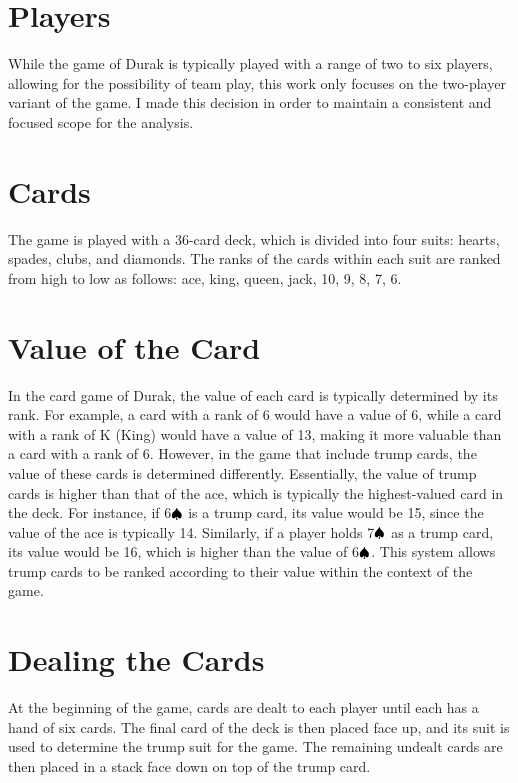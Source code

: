 \section{Players}
While the game of Durak is typically played with a range of two to six players, allowing for the possibility of team play, this work only focuses on the two-player variant of the game. I made this decision in order to maintain a consistent and focused scope for the analysis.

\section{Cards}
The game is played with a 36-card deck, which is divided into four suits: hearts, spades, clubs, and diamonds. The ranks of the cards within each suit are ranked from high to low as follows: ace, king, queen, jack, 10, 9, 8, 7, 6.

\section{Value of the Card}

In the card game of Durak, the value of each card is typically determined by its rank. For example, a card with a rank of 6 would have a value of 6, while a card with a rank of K (King) would have a value of 13, making it more valuable than a card with a rank of 6. However, in the game that include trump cards, the value of these cards is determined differently. Essentially, the value of trump cards is higher than that of the ace, which is typically the highest-valued card in the deck. For instance, if 6$\textcolor{black}{\spadesuit}$ is a trump card, its value would be 15, since the value of the ace is typically 14. Similarly, if a player holds 7$\textcolor{black}{\spadesuit}$ as a trump card, its value would be 16, which is higher than the value of 6$\textcolor{black}{\spadesuit}$. This system allows trump cards to be ranked according to their value within the context of the game.

\section{Dealing the Cards}
\label{dealingCards}
At the beginning of the game, cards are dealt to each player until each has a hand of six cards. The final card of the deck is then placed face up, and its suit is used to determine the trump suit for the game. The remaining undealt cards are then placed in a stack face down on top of the trump card.

